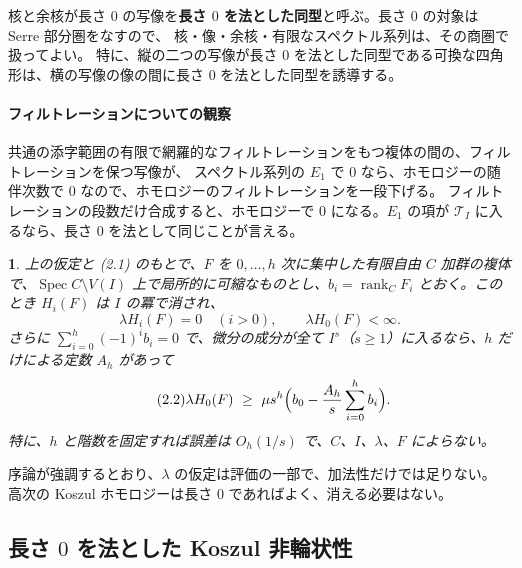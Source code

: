 \documentclass[11pt,a4paper]{ltjsarticle}
\newcommand{\stmtname}{}
\theoremstyle{plain}
\newtheorem*{stmtgen}{\stmtname}
\newenvironment{stmt}[1]{\renewcommand{\stmtname}{#1}\begin{stmtgen}}{\end{stmtgen}}
\theoremstyle{definition}
\newcommand{\rank}{\operatorname{rank}}
\newcommand{\Spec}{\operatorname{Spec}}
\newcommand{\cT}{\mathcal{T}}
\begin{document}
核と余核が長さ $0$ の写像を\textbf{長さ $0$ を法とした同型}と呼ぶ。長さ $0$ の対象は Serre 部分圏をなすので、
核・像・余核・有限なスペクトル系列は、その商圏で扱ってよい。
特に、縦の二つの写像が長さ $0$ を法とした同型である可換な四角形は、横の写像の像の間に長さ $0$ を法とした同型を誘導する。

\paragraph{フィルトレーションについての観察}
共通の添字範囲の有限で網羅的なフィルトレーションをもつ複体の間の、フィルトレーションを保つ写像が、
スペクトル系列の $E_1$ で $0$ なら、ホモロジーの随伴次数で $0$ なので、ホモロジーのフィルトレーションを一段下げる。
フィルトレーションの段数だけ合成すると、ホモロジーで $0$ になる。$E_1$ の項が $\cT_I$ に入るなら、長さ $0$ を法として同じことが言える。

\begin{stmt}{定理 2.1}
上の仮定と (2.1) のもとで、$F$ を $0,\dots,h$ 次に集中した有限自由 $C$ 加群の複体で、$\Spec C\setminus V(I)$ 上で局所的に可縮なものとし、$b_i = \rank_CF_i$ とおく。このとき $H_i(F)$ は $I$ の冪で消され、
\[
  \lambda H_i(F) = 0\quad(i>0),\qquad \lambda H_0(F)<\infty.
\]
さらに $\sum_{i=0}^h(-1)^ib_i = 0$ で、微分の成分が全て $I^s$（$s\ge1$）に入るなら、$h$ だけによる定数 $A_h$ があって
\begin{equation}\tag{2.2}
  \lambda H_0(F)\ \ge\ \mu s^h\Bigl(b_0-\frac{A_h}{s}\sum_{i=0}^hb_i\Bigr).
\end{equation}
特に、$h$ と階数を固定すれば誤差は $O_h(1/s)$ で、$C$、$I$、$\lambda$、$F$ によらない。
\end{stmt}

序論が強調するとおり、$\lambda$ の仮定は評価の一部で、加法性だけでは足りない。
高次の Koszul ホモロジーは長さ $0$ であればよく、消える必要はない。

\subsection{長さ $0$ を法とした Koszul 非輪状性}
\end{document}

